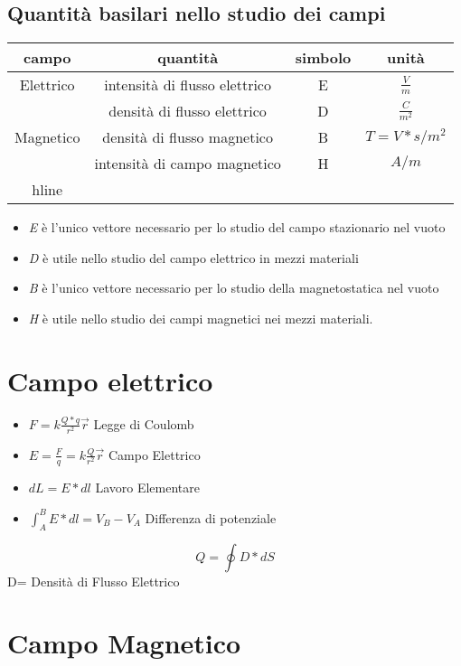 \documentclass{book}
\begin{document}
\subsection{Quantità basilari nello studio dei campi}
\begin{table}[ht]
  \centering
    \begin{tabular}{|c|c|c|c|}
      \hline
      campo 	& 	    quantità 		& simbolo & unità \\\hline
      Elettrico & intensità di flusso elettrico &    E    & $\frac{V}{m}$ \\
                & densità di flusso elettrico 	&    D 	  & $\frac{C}{m^2}$\\
      Magnetico & densità di flusso magnetico 	&    B 	  & $T=V*s/m^2$\\
      		& intensità di campo magnetico  &    H	  & $A/m$\\hline
    \end{tabular}
\end{table}
\begin{itemize}
    \item \textit{E} è l'unico vettore necessario per lo studio del campo stazionario nel vuoto
    \item \textit{D} è utile nello studio del campo elettrico in mezzi materiali
    \item \textit{B} è l'unico vettore necessario per lo studio della magnetostatica nel vuoto
    \item \textit{H} è utile nello studio dei campi magnetici nei mezzi materiali.
\end{itemize}
\section {Campo elettrico}
\begin{itemize}
    \item $F=k\frac{Q*q}{r^2}\overrightarrow{r}$ Legge di Coulomb
    \item $E=\frac{F}{q}=k\frac{Q}{r^2}\overrightarrow{r}$ Campo Elettrico
    \item $dL=E*dl$ Lavoro Elementare
    \item $\int^B_A E*dl=V_B-V_A$ Differenza di potenziale
\end{itemize}
\begin{equation*}
  Q=\oint D*dS
\end{equation*}
D= Densità di Flusso Elettrico
\section{Campo Magnetico}
\end{document}
